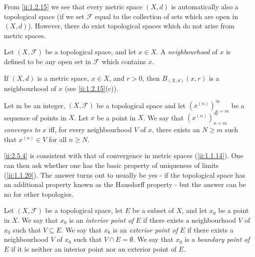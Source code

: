 \begin{note}
  From \cref{ii:1.2.15} we see that every metric space \((X, d)\) is automatically also a topological space
  (if we set \(\mathcal{F}\) equal to the collection of sets which are open in \((X, d)\)).
  However, there do exist topological spaces which do not arise from metric spaces.
\end{note}

\begin{defn}[Neighbourhoods]\label{ii:2.5.2}
  Let \((X, \mathcal{F})\) be a topological space, and let \(x \in X\).
  A \emph{neighbourhood} of \(x\) is defined to be any open set in \(\mathcal{F}\) which contains \(x\).
\end{defn}

\begin{eg}\label{ii:2.5.3}
  If \((X, d)\) is a metric space, \(x \in X\), and \(r > 0\), then \(B_{(X, d)}(x, r)\) is a neighbourhood of \(x\) (see \cref{ii:1.2.15}(c)).
\end{eg}

\begin{defn}\label{ii:2.5.4}
  Let m be an integer, \((X, \mathcal{F})\) be a topological space and let \((x^{(n)})_{n = m}^\infty\) be a sequence of points in \(X\).
  Let \(x\) be a point in \(X\).
  We say that \((x^{(n)})_{n = m}^\infty\) \emph{converges to} \(x\) iff, for every neighbourhood \(V\) of \(x\), there exists an \(N \geq m\) such that \(x^{(n)} \in V\) for all \(n \geq N\).
\end{defn}

\begin{note}
  \cref{ii:2.5.4} is consistent with that of convergence in metric spaces (\cref{ii:1.1.14}).
  One can then ask whether one has the basic property of uniqueness of limits (\cref{ii:1.1.20}).
  The answer turns out to usually be yes
  - if the topological space has an additional property known as the Hausdorff property
  - but the answer can be no for other topologies.
\end{note}

\begin{defn}\label{ii:2.5.5}
  Let \((X, \mathcal{F})\) be a topological space, let \(E\) be a subset of \(X\), and let \(x_0\) be a point in \(X\).
  We say that \(x_0\) is an \emph{interior point of} \(E\) if there exists a neighbourhood \(V\) of \(x_0\) such that \(V \subseteq E\).
  We say that \(x_0\) is an \emph{exterior point of} \(E\) if there exists a neighbourhood \(V\) of \(x_0\) such that \(V \cap E = \emptyset\).
  We say that \(x_0\) is a \emph{boundary point of} \(E\) if it is neither an interior point nor an exterior point of \(E\).
\end{defn}

